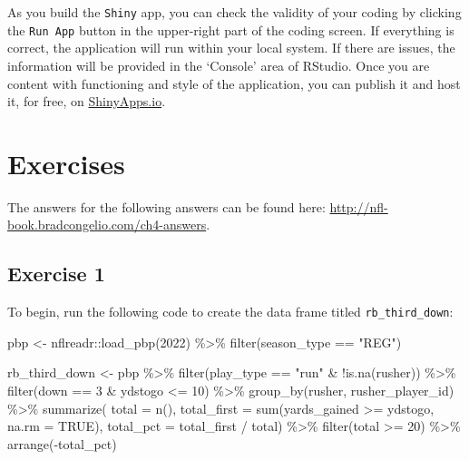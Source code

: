 \documentclass[
  letterpaper,
]{krantz}
\newenvironment{Shaded}{\begin{snugshade}}{\end{snugshade}}
\newcommand{\AttributeTok}[1]{\textcolor[rgb]{0.40,0.45,0.13}{#1}}
\newcommand{\ConstantTok}[1]{\textcolor[rgb]{0.56,0.35,0.01}{#1}}
\newcommand{\DecValTok}[1]{\textcolor[rgb]{0.68,0.00,0.00}{#1}}
\newcommand{\FunctionTok}[1]{\textcolor[rgb]{0.28,0.35,0.67}{#1}}
\newcommand{\NormalTok}[1]{\textcolor[rgb]{0.00,0.23,0.31}{#1}}
\newcommand{\OtherTok}[1]{\textcolor[rgb]{0.00,0.23,0.31}{#1}}
\newcommand{\SpecialCharTok}[1]{\textcolor[rgb]{0.37,0.37,0.37}{#1}}
\newcommand{\StringTok}[1]{\textcolor[rgb]{0.13,0.47,0.30}{#1}}
\begin{document}
As you build the \texttt{Shiny} app, you can check the validity of your
coding by clicking the \texttt{Run\ App} button in the upper-right part
of the coding screen. If everything is correct, the application will run
within your local system. If there are issues, the information will be
provided in the `Console' area of RStudio. Once you are content with
functioning and style of the application, you can publish it and host
it, for free, on \href{https://www.shinyapps.io/}{ShinyApps.io}.

\hypertarget{exercises-2}{%
\section{Exercises}\label{exercises-2}}

The answers for the following answers can be found here:
\url{http://nfl-book.bradcongelio.com/ch4-answers}.

\hypertarget{exercise-1-2}{%
\subsection{Exercise 1}\label{exercise-1-2}}

To begin, run the following code to create the data frame titled
\texttt{rb\_third\_down}:

\begin{Shaded}
\begin{Highlighting}[]
\NormalTok{pbp }\OtherTok{\textless{}{-}}\NormalTok{ nflreadr}\SpecialCharTok{::}\FunctionTok{load\_pbp}\NormalTok{(}\DecValTok{2022}\NormalTok{) }\SpecialCharTok{\%\textgreater{}\%}
  \FunctionTok{filter}\NormalTok{(season\_type }\SpecialCharTok{==} \StringTok{"REG"}\NormalTok{)}

\NormalTok{rb\_third\_down }\OtherTok{\textless{}{-}}\NormalTok{ pbp }\SpecialCharTok{\%\textgreater{}\%}
  \FunctionTok{filter}\NormalTok{(play\_type }\SpecialCharTok{==} \StringTok{"run"} \SpecialCharTok{\&} \SpecialCharTok{!}\FunctionTok{is.na}\NormalTok{(rusher)) }\SpecialCharTok{\%\textgreater{}\%}
  \FunctionTok{filter}\NormalTok{(down }\SpecialCharTok{==} \DecValTok{3} \SpecialCharTok{\&}\NormalTok{ ydstogo }\SpecialCharTok{\textless{}=} \DecValTok{10}\NormalTok{) }\SpecialCharTok{\%\textgreater{}\%}
  \FunctionTok{group\_by}\NormalTok{(rusher, rusher\_player\_id) }\SpecialCharTok{\%\textgreater{}\%}
  \FunctionTok{summarize}\NormalTok{(}
    \AttributeTok{total =} \FunctionTok{n}\NormalTok{(),}
    \AttributeTok{total\_first =} \FunctionTok{sum}\NormalTok{(yards\_gained }\SpecialCharTok{\textgreater{}=}\NormalTok{ ydstogo, }\AttributeTok{na.rm =} \ConstantTok{TRUE}\NormalTok{),}
    \AttributeTok{total\_pct =}\NormalTok{ total\_first }\SpecialCharTok{/}\NormalTok{ total) }\SpecialCharTok{\%\textgreater{}\%}
  \FunctionTok{filter}\NormalTok{(total }\SpecialCharTok{\textgreater{}=} \DecValTok{20}\NormalTok{) }\SpecialCharTok{\%\textgreater{}\%}
  \FunctionTok{arrange}\NormalTok{(}\SpecialCharTok{{-}}\NormalTok{total\_pct)}
\end{Highlighting}
\end{Shaded}
\end{document}
